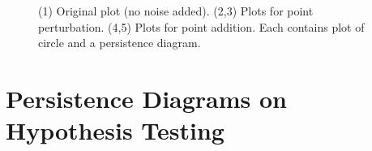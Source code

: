 \documentclass[a4paper]{article}
\begin{document}
\begin{figure}[htp!]
\begin{subfigure}{.20\textwidth}
\end{subfigure}
\caption{(1) Original plot (no noise added). (2,3) Plots for point perturbation. (4,5) Plots for point addition. Each contains plot of circle and a persistence diagram.}
\end{figure}



\section{Persistence Diagrams on Hypothesis Testing}
\end{document}
